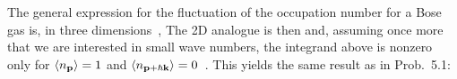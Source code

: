 {		The general expression for the fluctuation of the occupation number for a Bose gas is, in three dimensions~\cite[p.~356]{Landau2},
	The 2D analogue is then
	and, assuming once more that we are interested in small wave numbers, the integrand above is nonzero only for $\ev{n_{\vp}} = 1$ and $\ev{n_{\vp + \hbar \vk}} = 0$~\cite[p.~357]{Landau}.  This yields the same result as in Prob.~{5.1}:
	\vfix
}